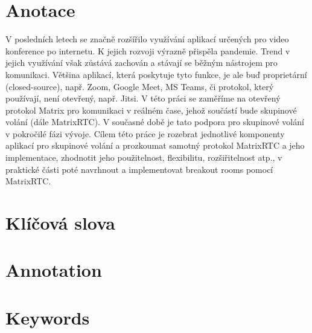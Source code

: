 \section*{Anotace}
V posledních letech se značně rozšířilo využívání aplikací určených pro video konference po internetu. K jejich rozvoji výrazně přispěla pandemie. Trend v jejich využívání však zůstává zachován a stávají se běžným nástrojem pro komunikaci. Většina aplikací, která poskytuje tyto funkce, je ale buď proprietární (closed-source), např. Zoom, Google Meet, MS Teams, či protokol, který používají, není otevřený, např. Jitsi. V této práci se zaměříme na otevřený protokol Matrix pro komunikaci v reálném čase, jehož součástí bude skupinové volání (dále MatrixRTC). V současné době je tato podpora pro skupinové volání v pokročilé fázi vývoje. Cílem této práce je rozebrat jednotlivé komponenty aplikací pro skupinové volání a prozkoumat samotný protokol MatrixRTC a jeho implementace, zhodnotit jeho použitelnost, flexibilitu, rozšiřitelnost atp., v  praktické části poté navrhnout a implementovat breakout rooms pomocí MatrixRTC.

\section*{Klíčová slova}

\section*{Annotation}

\section*{Keywords}
